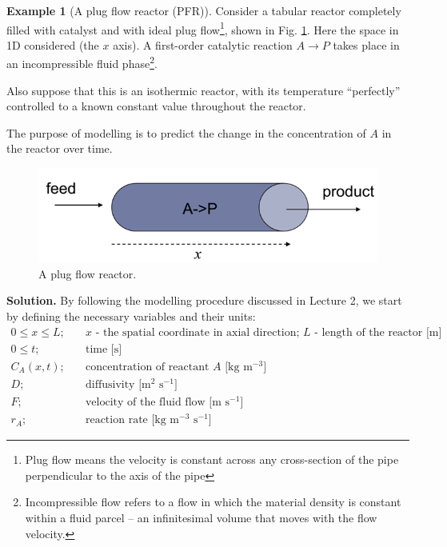 \documentclass[a4paper,11pt]{article}
\theoremstyle{definition}
\newtheorem{exmp}{Example}[section]
\begin{document}
\begin{exmp}[A plug flow reactor (PFR)]
\label{exmp:pfr}
Consider a tabular reactor completely filled with catalyst and 
with ideal plug flow\footnote{Plug flow means the velocity is constant across any cross-section
of the pipe perpendicular to the axis of the pipe}, shown in Fig. \ref{fig:pfr}.
Here the space in 1D considered (the $x$ axis). A first-order catalytic reaction $A \to P$ 
takes place in an incompressible fluid phase\footnote{Incompressible flow refers to a flow in which the material density is constant within a fluid parcel -- an infinitesimal volume that moves with the flow velocity.}.

Also suppose that this is an isothermic reactor, with its temperature ``perfectly'' controlled
to a known constant value throughout the reactor.

The purpose of modelling is to predict the change in the concentration of $A$ in the reactor over time.

\begin{figure} [!h]
 \begin{center}
	\includegraphics[width=.55\textwidth]{pfr}
 \end{center}
 \caption{A plug flow reactor.} 
 \label{fig:pfr}
\end{figure}

\noindent \textbf{Solution.} By following the modelling procedure discussed in Lecture 2,
we start by defining the necessary variables and their units:
\begin{align}
	0 \leq x \leq L; \quad &\textrm{$x$ - the spatial coordinate in axial direction; $L$ - length of the reactor [m]} \nonumber \\
	0 \leq t; \quad &\textrm{time [s]} \nonumber \\
	C_A(x, t); \quad &\textrm{concentration of reactant $A$ [kg m$^{-3}$]} \nonumber \\
	D; \quad &\textrm{diffusivity [m$^2$ s$^{-1}$]} \nonumber 	\\
	F;  \quad &\textrm{velocity of the fluid flow [m s$^{-1}$]} \nonumber 	\\
	r_A; \quad &\textrm{reaction rate [kg m$^{-3}$ s$^{-1}$]} \nonumber 
\end{align}


\end{exmp}
\end{document}
